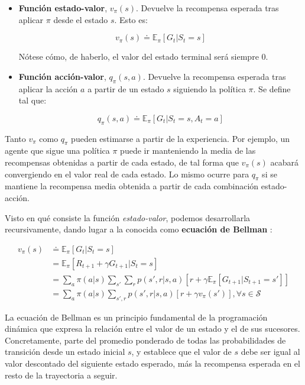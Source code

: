 \begin{itemize}
    \item \textbf{Función estado-valor}, $v_\pi(s)$. Devuelve la recompensa esperada tras aplicar $\pi$ desde el estado $s$. Esto es:
    
    \begin{equation}
        v_\pi(s) \doteq \mathds{E}_\pi [G_t | S_t = s]
    \end{equation}
    
    Nótese cómo, de haberlo, el valor del estado terminal será siempre 0.
    
    \item \textbf{Función acción-valor}, $q_\pi(s,a)$. Devuelve la recompensa esperada tras aplicar la acción $a$ a partir de un estado $s$ siguiendo la política $\pi$. Se define tal que:
    
    \begin{equation}
        q_\pi(s,a) \doteq \mathds{E}_\pi [G_t | S_t = s, A_t = a]
    \end{equation}
\end{itemize}

Tanto $v_\pi$ como $q_\pi$ pueden estimarse a partir de la experiencia. Por ejemplo, un agente que sigue una política $\pi$ puede ir manteniendo la media de las recompensas obtenidas a partir de cada estado, de tal forma que $v_\pi(s)$ acabará convergiendo en el valor real de cada estado. Lo mismo ocurre para $q_\pi$ si se mantiene la recompensa media obtenida a partir de cada combinación estado-acción.

Visto en qué consiste la función \textit{estado-valor}, podemos desarrollarla recursivamente, dando lugar a la conocida como \textbf{ecuación de Bellman} \cite{bellman1966dynamic}:

\begin{equation}
    \begin{split}
        v_\pi(s) & \doteq \mathds{E}_\pi [G_t | S_t = s] \\
        & = \mathds{E}_\pi [R_{t+1} + \gamma G_{t+1} | S_t = s] \\ 
        &= \sum_{a} \pi(a|s) \sum_{s'}\sum_{r} p(s',r|s,a)[r + \gamma \mathds{E}_\pi [G_{t+1} | S_{t+1} = s']] \\ 
        & = \sum_{a} \pi(a|s) \sum_{s',r} p(s',r|s,a)[r + \gamma v_\pi(s')], \forall s \in \mathcal{S}
    \end{split}
\end{equation}

La ecuación de Bellman es un principio fundamental de la programación dinámica \cite{bellman1966dynamic} que expresa la relación entre el valor de un estado y el de sus sucesores. Concretamente, parte del promedio ponderado de todas las probabilidades de transición desde un estado inicial $s$, y establece que el valor de $s$ debe ser igual al valor descontado del siguiente estado esperado, más la recompensa esperada en el resto de la trayectoria a seguir.

